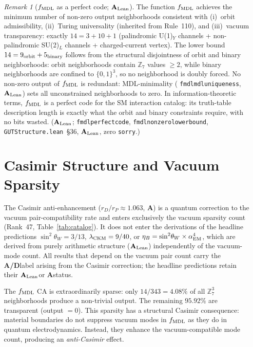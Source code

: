 \documentclass[11pt]{article}
\theoremstyle{remark}
\newtheorem{remark}[theorem]{Remark}
\newcommand{\lean}[1]{%
  \penalty-100
  \begingroup\def\_{\textunderscore\allowbreak}\texttt{#1}\endgroup}
\newcommand{\sinwsq}{\sin^2\!\theta_W}
\newcommand{\CatA}{\textbf{A}}
\newcommand{\CatAL}{\ensuremath{\textbf{A}_{\rm Lean}}}
\newcommand{\CatAD}{\textbf{A/D}}
\begin{document}
\begin{remark}[$f_{\rm MDL}$ as a perfect code; $\CatAL$]
\label{rem:perfect_code}
The function $f_{\rm MDL}$ achieves the minimum number of non-zero output
neighborhoods consistent with (i)~orbit admissibility,
(ii)~Turing universality (inherited from Rule~110), and
(iii)~vacuum transparency: exactly
$14 = 3 + 10 + 1$
(palindromic U(1)$_Y$ channels + non-palindromic SU(2)$_L$ channels +
charged-current vertex).
The lower bound $14 = 9_{\rm orbit} + 5_{\rm binary}$ follows from
the structural disjointness of orbit and binary neighborhoods: orbit
neighborhoods contain $\mathbb{Z}_7$ values $\geq 2$, while binary
neighborhoods are confined to $\{0,1\}^3$, so no neighborhood is doubly
forced.
No non-zero output of $f_{\rm MDL}$ is redundant: MDL-minimality
(\lean{fmdl\_mdl\_uniqueness}, $\CatAL$) sets all unconstrained
neighborhoods to zero.
In information-theoretic terms, $f_{\rm MDL}$ is a perfect code for the
SM interaction catalog: its truth-table description length is exactly
what the orbit and binary constraints require, with no bits wasted.
($\CatAL$; \lean{fmdl\_perfect\_code}, \lean{fmdl\_nonzero\_lower\_bound},
\lean{GUTStructure.lean}~\S36, $\CatAL$, zero \texttt{sorry}.)
\end{remark}

\section{Casimir Structure and Vacuum Sparsity}
\label{sec:casimir}

The Casimir anti-enhancement ($r_D/r_P \approx 1.063$, \CatA) is a quantum correction to
the vacuum pair-compatibility rate and enters exclusively the vacuum sparsity count
(Rank~47, Table~\ref{tab:catalog}).
It does not enter the derivations of the headline predictions $\sinwsq = 3/13$,
$\lambda_{\rm CKM} = 9/40$, or $\eta_B = \sinwsq \times \alpha_{\rm EM}^4$, which are
derived from purely arithmetic structure (\CatAL) independently of the vacuum-mode count.
All results that depend on the vacuum pair count carry the \CatAD label arising from the
Casimir correction; the headline predictions retain their \CatAL or \CatA status.

The $f_{\rm MDL}$ CA is extraordinarily sparse: only $14 / 343 = 4.08\%$ of
all $\mathbb{Z}_7^3$ neighborhoods produce a non-trivial output.
The remaining $95.92\%$ are transparent (output $= 0$).
This sparsity has a structural Casimir consequence: material boundaries do not
suppress vacuum modes in $f_{\rm MDL}$ as they do in quantum electrodynamics.
Instead, they enhance the vacuum-compatible mode count, producing an
\emph{anti-Casimir} effect.
\end{document}
